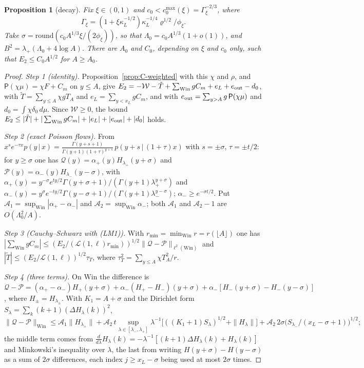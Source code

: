 \documentclass[10pt,letterpaper]{article}
\newtheorem{proposition}[theorem]{Proposition}
\begin{document}
\begin{proposition}[decay]\label{thm:C-decay}
Fix $\xi\in(0,1)$ and $c_0<c_{0}^{\max}(\xi)=\Gamma_\xi^{-2/3}$, where
\[\Gamma_\xi=(1+\xi\kappa_L^{-1/2})\kappa_L^{-1/4}\varrho^{1/2}/\phi_\xi.\]
Take $\sigma=\mathrm{round}(c_0A^{1/3}\xi/(2\phi_\xi))$, so that $\Lambda_0=c_0A^{1/3}(1+o(1))$, and $B^2=\lambda_+(\Lambda_0+4\log A)$.
There are $A_0$ and $C_0$, depending on $\xi$ and $c_0$ only, such that $E_2\le C_0A^{1/2}$ for $A\ge A_0$.
\end{proposition}
\begin{proof}
\emph{Step 1 (identity).} Proposition~\ref{prop:C-weighted} with this $\chi$ and $\rho$, and $\mathsf P(\chi\mu)=\chi F+C_m$ on $y\le A$,
give $E_2=-\mathcal W-\tilde T+\sum_{\mathrm{Win}}gC_m+e_L+e_{\rm out}-d_0$, with $\tilde T=\sum_{y\le A}\chi gT_A$ and $e_L=\sum_{y<x_L}gC_m$, and with $e_{\rm out}=\sum_{y>A}g\,\mathsf P(\chi\mu)$ and $d_0=\int\chi\delta_0\,d\mu$. Since $\mathcal W\ge0$, the bound $E_2\le|\tilde T|+|\sum_{\mathrm{Win}}gC_m|+|e_L|+|e_{\rm out}|+|d_0|$ holds.

\emph{Step 2 (exact Poisson flows).} From
$x^se^{-\tau x}p(y\,|\,x)=\frac{\Gamma(y+s+1)}{\Gamma(y+1)(1+\tau)^{y+s}}\,p(y+s\,|\,(1+\tau)x)$ with $s=\pm\sigma$, $\tau=\pm t/2$:
for $y\ge\sigma$ one has $\mathcal Q(y)=\alpha_+(y)H_{\lambda_+}(y+\sigma)$ and $\mathcal P(y)=\alpha_-(y)H_{\lambda_-}(y-\sigma)$, with
$\alpha_+(y)=y^{-\sigma}e^{ty/2}\Gamma(y+\sigma+1)/(\Gamma(y+1)\lambda_+^{y+\sigma})$ and
$\alpha_-(y)=y^{\sigma}e^{-ty/2}\Gamma(y-\sigma+1)/(\Gamma(y+1)\lambda_-^{y-\sigma})$; $\alpha_-\ge e^{-\sigma t/2}$. Put
$\mathcal A_1=\sup_{\mathrm{Win}}|\alpha_+-\alpha_-|$ and $\mathcal A_2=\sup_{\mathrm{Win}}\alpha_-$; both $\mathcal A_1$ and $\mathcal A_2-1$
are $O(\Lambda_0^2/A)$.

\emph{Step 3 (Cauchy--Schwarz with (LM1)).} With $r_{\min}=\min_{\mathrm{Win}}r=r(\lfloor A\rfloor)$ one has $|\sum_{\mathrm{Win}}gC_m|\le(E_2/(\mathcal L(1,\ell)r_{\min}))^{1/2}\|\mathcal Q-\mathcal P\|_{\ell^2(\mathrm{Win})}$ and
$|\tilde T|\le(E_2/\mathcal L(1,\ell))^{1/2}\tau_T$, where $\tau_T^2=\sum_{y\le A}\chi T_A^2/r$.

\emph{Step 4 (three terms).} On $\mathrm{Win}$ the difference is $\mathcal Q-\mathcal P=(\alpha_+-\alpha_-)H_+(y+\sigma)+\alpha_-(H_+-H_-)(y+\sigma)+\alpha_-[H_-(y+\sigma)-H_-(y-\sigma)]$, where
$H_\pm=H_{\lambda_\pm}$. With $K_1=A+\sigma$ and the Dirichlet form $S_\lambda=\sum_k(k+1)(\Delta H_\lambda(k))^2$,
\[
\|\mathcal Q-\mathcal P\|_{\mathrm{Win}}\le\mathcal A_1\|H_{\lambda_+}\|
+\mathcal A_2\,t\sup_{\lambda\in[\lambda_-,\lambda_+]}\lambda^{-1}\bigl[((K_1+1)S_\lambda)^{1/2}+\|H_\lambda\|\bigr]
+\mathcal A_2\,2\sigma\bigl(S_{\lambda_-}/(x_L-\sigma+1)\bigr)^{1/2};
\]
the middle term comes from $\frac{d}{d\lambda}H_\lambda(k)=-\lambda^{-1}[(k+1)\Delta H_\lambda(k)+H_\lambda(k)]$ and Minkowski's
inequality over $\lambda$, the last from writing $H(y+\sigma)-H(y-\sigma)$ as a sum of $2\sigma$ differences, each index
$j\ge x_L-\sigma$ being used at most $2\sigma$ times.


\end{proof}
\end{document}
